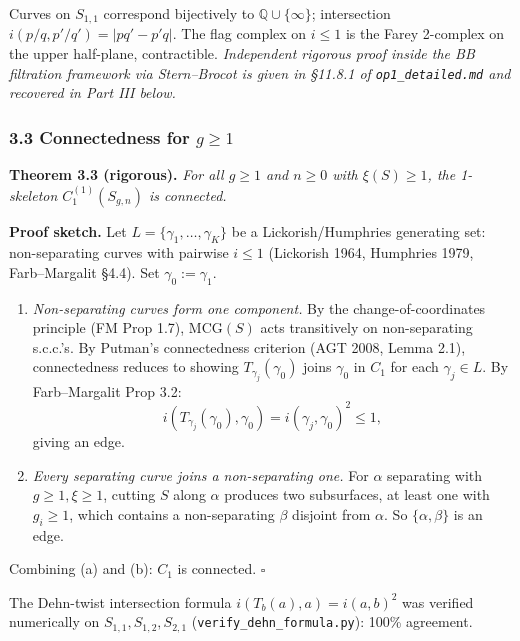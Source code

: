 \documentclass[
]{article}
\begin{document}
Curves on \(S_{1,1}\) correspond bijectively to
\(\mathbb Q \cup \{\infty\}\); intersection
\(i(p/q, p'/q') = |pq' - p'q|\). The flag complex on \(i \le 1\) is the
Farey 2-complex on the upper half-plane, contractible. \emph{Independent
rigorous proof inside the BB filtration framework via Stern--Brocot is
given in §11.8.1 of \texttt{op1\_detailed.md} and recovered in Part III
below.}

\subsubsection{\texorpdfstring{3.3 Connectedness for
\(g \ge 1\)}{3.3 Connectedness for g \textbackslash ge 1}}\label{connectedness-for-g-ge-1}

\textbf{Theorem 3.3 (rigorous).} \emph{For all \(g \ge 1\) and
\(n \ge 0\) with \(\xi(S) \ge 1\), the 1-skeleton \(C_1^{(1)}(S_{g,n})\)
is connected.}

\textbf{Proof sketch.} Let \(L = \{\gamma_1,\ldots,\gamma_K\}\) be a
Lickorish/Humphries generating set: non-separating curves with pairwise
\(i \le 1\) (Lickorish 1964, Humphries 1979, Farb--Margalit §4.4). Set
\(\gamma_0 := \gamma_1\).

\begin{enumerate}
\def\labelenumi{(\alph{enumi})}
\item
  \emph{Non-separating curves form one component.} By the
  change-of-coordinates principle (FM Prop 1.7), \(\mathrm{MCG}(S)\)
  acts transitively on non-separating s.c.c.'s. By Putman's
  connectedness criterion (AGT 2008, Lemma 2.1), connectedness reduces
  to showing \(T_{\gamma_j}(\gamma_0)\) joins \(\gamma_0\) in \(C_1\)
  for each \(\gamma_j \in L\). By Farb--Margalit Prop 3.2:
  \[ i(T_{\gamma_j}(\gamma_0), \gamma_0) = i(\gamma_j, \gamma_0)^2 \le 1, \]
  giving an edge.
\item
  \emph{Every separating curve joins a non-separating one.} For
  \(\alpha\) separating with \(g \ge 1, \xi \ge 1\), cutting \(S\) along
  \(\alpha\) produces two subsurfaces, at least one with \(g_i \ge 1\),
  which contains a non-separating \(\beta\) disjoint from \(\alpha\). So
  \(\{\alpha,\beta\}\) is an edge.
\end{enumerate}

Combining (a) and (b): \(C_1\) is connected. \(\square\)

The Dehn-twist intersection formula \(i(T_b(a), a) = i(a, b)^2\) was
verified numerically on \(S_{1,1}, S_{1,2}, S_{2,1}\)
(\texttt{verify\_dehn\_formula.py}): 100\% agreement.
\end{document}

